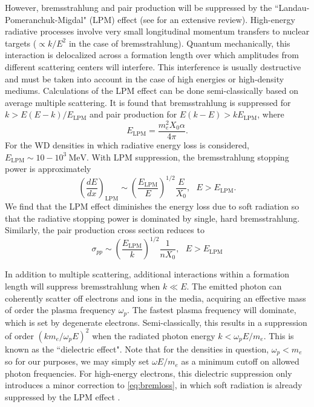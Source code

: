 \documentclass[twocolumn,showpacs,preprintnumbers,amsmath,amssymb,prd]{revtex4}
\def\r{\right)}
\def\l{\left(}
\begin{document}
\begin{appendices}
However, bremsstrahlung and pair production will be suppressed by the ``Landau-Pomeranchuk-Migdal" (LPM) effect (see \cite{Klein:1998du} for an extensive review). High-energy radiative processes involve very small longitudinal momentum transfers to nuclear targets ($\propto k/E^2$ in the case of bremsstrahlung). Quantum mechanically, this interaction is delocalized across a formation length over which amplitudes from different scattering centers will interfere. This interference is usually destructive and must be taken into account in the case of high energies or high-density mediums. Calculations of the LPM effect can be done semi-classically based on average multiple scattering. It is found that bremsstrahlung is suppressed for $k > E(E-k)/E_\text{LPM}$ and pair production for $E(k-E) > k E_\text{LPM}$, where
\begin{equation}
\label{eq:LPM}
E_\text{LPM} = \frac{m_e^2 X_0 \alpha}{4 \pi}.
\end{equation}
For the WD densities in which radiative energy loss is considered, $E_\text{LPM} \sim 10-10^{3} ~\text{MeV}$. With LPM suppression, the bremsstrahlung stopping power is approximately
\begin{equation}
\label{eq:bremloss}
\l\frac{dE}{dx}\r_\text{LPM} \sim \l\frac{E_\text{LPM}}{E} \r^{1/2} \frac{E}{X_0}, ~~~ E>E_\text{LPM}.
\end{equation}
We find that the LPM effect diminishes the energy loss due to soft radiation so that the radiative stopping power is dominated by single, hard bremsstrahlung. Similarly, the pair production cross section reduces to
\begin{equation}
\sigma_{pp} \sim \l\frac{E_\text{LPM}}{k} \r^{1/2} \frac{1}{n X_0}, ~~~ E>E_\text{LPM}
\end{equation}

In addition to multiple scattering, additional interactions within a formation length will suppress bremsstrahlung when $k \ll E$. The emitted photon can coherently scatter off electrons and ions in the media, acquiring an effective mass of order the plasma frequency $\omega_p$. The fastest plasma frequency will dominate, which is set by degenerate electrons.
Semi-classically, this results in a suppression of order $(k m_e/\omega_p E)^2$ when the radiated photon energy $k < \omega_p E/m_e$. This is known as the ``dielectric effect". Note that for the densities in question, $\omega_p < m_e$ so for our purposes, we may simply set $\omega E/m_e$ as a minimum cutoff on allowed photon frequencies. For high-energy electrons, this dielectric suppression only introduces a minor correction to \eqref{eq:bremloss}, in which soft radiation is already suppressed by the LPM effect \cite{Klein:1998du}. 


\end{appendices}
\end{document}
